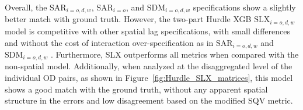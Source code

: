 
Overall, the $\text{SAR}_{i=o,d,w}$, $\text{SAR}_{i=o}$, and $\text{SDM}_{i=o,d,w}$ specifications show a slightly better match with ground truth. However, the two-part Hurdle XGB $\text{SLX}_{i=o,d,w}$ model is competitive with other spatial lag specifications, with small differences and without the cost of interaction over-specification as in $\text{SAR}_{i=o,d,w}$ and $\text{SDM}_{i=o,d,w}$ \citep{Griffith2020SomeModels}. 
Furthermore, SLX outperforms all metrics when compared with the non-spatial model. Additionally, when analyzed at the disaggregated level of the individual OD pairs, as shown in Figure~\ref{fig:Hurdle_SLX_matrices}, this model shows a good match with the ground truth, without any apparent spatial structure in the errors and low disagreement based on the modified SQV metric.

